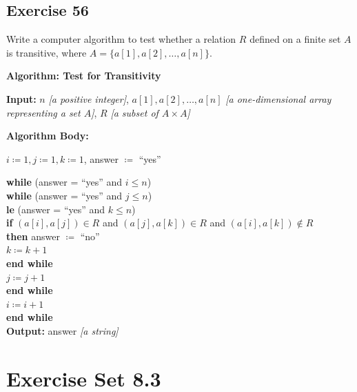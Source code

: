 \documentclass[14pt]{extarticle}
\newcommand{\cy}{\color{cyan}}
\begin{document}
\subsection{Exercise 56}
Write a computer algorithm to test whether a relation \(R\) defined on a finite set \(A\) is transitive, where 
\(A = \{a[1], a[2], \ldots, a[n]\}\).

\begin{tcolorbox}[colframe=cyan]
{\bf \cy Algorithm: Test for Transitivity} 

{\bf Input:} $n$ {\it [a positive integer]}, \(a[1], a[2], \ldots, a[n]\) {\it [a one-dimensional array representing a set $A$]}, $R$ {\it [a subset of \(A \times A\)]}

{\bf Algorithm Body:}

\(i \coloneqq 1, j \coloneqq 1, k \coloneqq 1\), answer $\coloneqq$ ``yes''
\end{tcolorbox}

\begin{tcolorbox}[colframe=cyan]
\begin{tabbing}
{\bf whi}\= {\bf le} (answer = ``yes'' and \(i \leq n\)) \\
         \> {\bf whi}\={\bf le} (answer = ``yes'' and \(j \leq n\)) \\
         \>          \={\bf le} (answer = ``yes'' and \(k \leq n\)) \\
         \>          \>         \> {\bf if} \((a[i], a[j]) \in R\) and \((a[j], a[k]) \in R\) and \((a[i], a[k]) \notin R\) \\
         \>          \>         \>  {\bf then} answer \(\coloneqq\) ``no'' \\
         \>           \>        \> \(k \coloneqq k+1\) \\
         \>           \> {\bf end while} \\
         \>           \> \(j \coloneqq j+1\) \\
         \> {\bf end while} \\
         \>  \(i \coloneqq i+1\) \\
{\bf end while} \\
{\bf Output:} answer {\it [a string]}
\end{tabbing}
\end{tcolorbox}

\section{Exercise Set 8.3}
\end{document}
